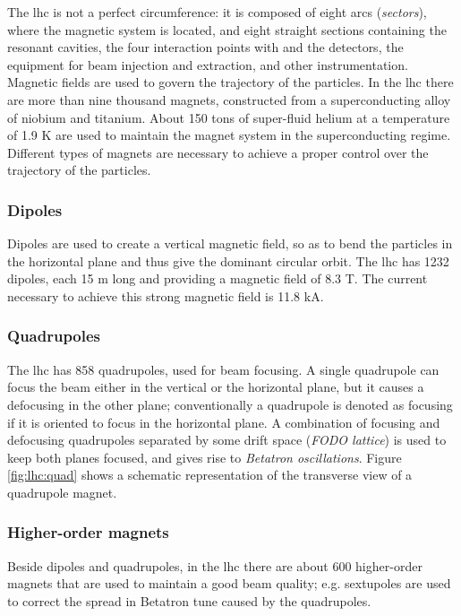The \gls{lhc} is not a perfect circumference: it is composed of eight arcs (\textit{sectors}), where the magnetic system is located, and eight straight sections containing the resonant cavities, the four interaction points with and the detectors, the equipment for beam injection and extraction, and other instrumentation. Magnetic fields are used to govern the trajectory of the particles. In the \gls{lhc} there are more than nine thousand magnets, constructed from a superconducting alloy of niobium and titanium. About 150 tons of super-fluid helium at a temperature of 1.9 K are used to maintain the magnet system in the superconducting regime. Different types of magnets are necessary to achieve a proper control over the trajectory of the particles.

\subsubsection*{Dipoles} 
Dipoles are used to create a vertical magnetic field, so as to bend the particles in the horizontal plane and thus give the dominant circular orbit. The \gls{lhc} has 1232 dipoles, each 15 m long and providing a magnetic field of 8.3 T. The current necessary to achieve this strong magnetic field is 11.8 kA.


\subsubsection*{Quadrupoles}
The \gls{lhc} has 858 quadrupoles, used for beam focusing. A single quadrupole can focus the beam either in the vertical or the horizontal plane, but it causes a defocusing in the other plane; conventionally a quadrupole is denoted as focusing if it is oriented to focus in the horizontal plane. A combination of focusing and defocusing quadrupoles separated by some drift space (\textit{FODO lattice}) is used to keep both planes focused, and gives rise to \textit{Betatron oscillations}. Figure \ref{fig:lhc:quad} shows a schematic representation of the transverse view of a quadrupole magnet.

\subsubsection*{Higher-order magnets} 
Beside dipoles and quadrupoles, in the \gls{lhc} there are about 600 higher-order magnets that are used to maintain a good beam quality; e.g.  sextupoles are used to correct the spread in Betatron tune caused by the quadrupoles.





